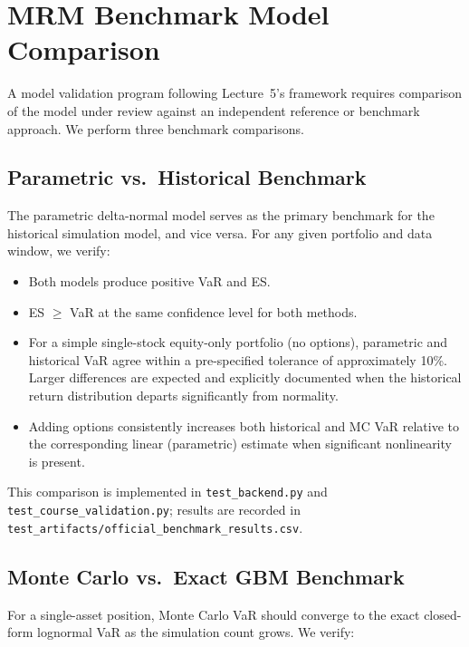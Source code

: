 \documentclass[11pt]{article}
\newcommand{\code}[1]{\texttt{#1}}
\begin{document}
\section{MRM Benchmark Model Comparison}
\label{sec:mrm-benchmark}

A model validation program following Lecture~5's framework requires
comparison of the model under review against an independent reference or
benchmark approach.  We perform three benchmark comparisons.

\subsection{Parametric vs.\ Historical Benchmark}

The parametric delta-normal model serves as the primary benchmark for
the historical simulation model, and vice versa.  For any given
portfolio and data window, we verify:

\begin{itemize}
  \item Both models produce positive VaR and ES.
  \item ES $\geq$ VaR at the same confidence level for both methods.
  \item For a simple single-stock equity-only portfolio (no options),
    parametric and historical VaR agree within a pre-specified tolerance
    of approximately 10\%.  Larger differences are expected and explicitly
    documented when the historical return distribution departs significantly
    from normality.
  \item Adding options consistently increases both historical and MC VaR
    relative to the corresponding linear (parametric) estimate when
    significant nonlinearity is present.
\end{itemize}

This comparison is implemented in \code{test\_backend.py} and
\code{test\_course\_validation.py}; results are recorded in
\code{test\_artifacts/official\_benchmark\_results.csv}.

\subsection{Monte Carlo vs.\ Exact GBM Benchmark}

For a single-asset position, Monte Carlo VaR should converge to the
exact closed-form lognormal VaR as the simulation count grows.
We verify:
\end{document}
